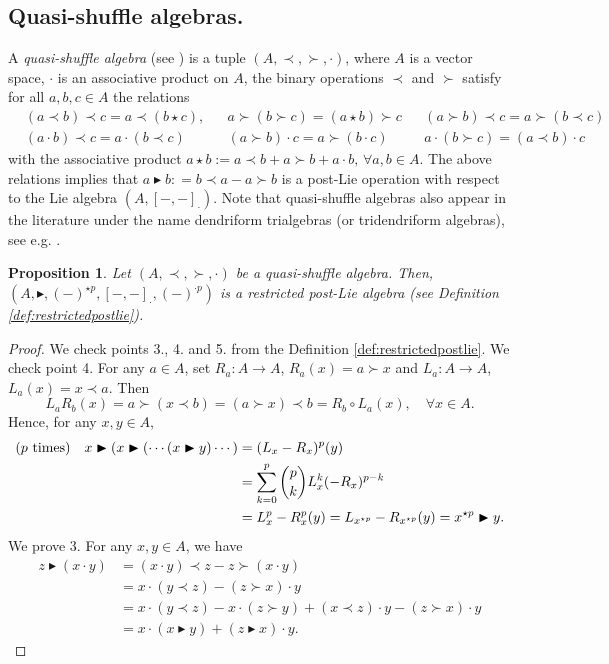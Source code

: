 \documentclass[12pt]{article}
\newcommand{\btr}{\blacktriangleright}
\newtheorem{proposition}[theorem]{Proposition}
\begin{document}
      \subsection{Quasi-shuffle algebras.} A \emph{quasi-shuffle algebra} (see \cite{H}) is a tuple $(A, \prec, \succ, \cdot)$, where $A$ is a vector space, $\cdot$ is an associative product on $A$, the binary operations $\prec$ and $\succ$ satisfy for all $a,b,c\in A$ the relations
      \begin{align}
      &(a \prec b ) \prec c = a \prec (b \star c), &&  a \succ ( b  \succ c ) = (a \star b) \succ c && (a \succ b) \prec c = a \succ (b \prec c) \\
      &(a\cdot b) \prec c = a \cdot (b \prec c)   && (a\succ b) \cdot c = a \succ (b \cdot c) && a\cdot (b \succ c) = (a  \prec b ) \cdot c
      \end{align}
 with the associative product $a\star b := a\prec b+ a\succ b+ a\cdot b,\,\forall a,b\in A$. The above relations implies that $ a \btr b : = b \prec a - a \succ b$ is a post-Lie operation with respect to the Lie algebra $(A, [-,-]_{\cdot})$. Note that quasi-shuffle algebras also appear in the literature under the name dendriform trialgebras (or tridendriform algebras), see e.g. \cite{LR}.

 \begin{proposition} Let $(A, \prec, \succ, \cdot)$ be a quasi-shuffle algebra. Then, 
 $
 (A, \btr, (-)^{\star p},[-,-]_{\cdot}, (-)^{\cdot p})
 $
 is a restricted post-Lie algebra (see Definition \ref{def:restrictedpostlie}).
  \end{proposition}
   \begin{proof} We check points 3., 4. and 5. from the Definition \ref{def:restrictedpostlie}. We check point 4.
   For any $a \in A$, set $R_a\colon A \to A$, $R_a(x) = a \succ x$ and $L_a\colon A \to A$, $L_a(x) = x \prec a$.
   Then 
   $$
   L_a R_b (x) = a\succ (x \prec b) = (a\succ x) \prec b = R_b \circ L_a (x), \quad \forall x \in A.
   $$
   Hence, for any $x,y \in A$,
   \begin{align*}
  (p ~{\rm times}) \quad  x \btr( x \btr( \cdots (x \btr y) \cdots ) & = (L_x - R_x)^{p}(y)  \\
  & = \sum_{k=0}^{p}\binom{p}{k}L_x^k (- R_x)^{p-k}\\  & = L_x^p - R_x^p (y) = L_{x^{\star p}} - R_{x^{\star p}}(y) = x^{\star p} \btr y.
  \end{align*}
We prove 3. For any $x,y\in A$, we have
\begin{align}
z \btr (x\cdot y) &= (x\cdot y) \prec z - z \succ (x\cdot y) \\ &= x \cdot (y \prec z) - (z \succ x) \cdot y \\
&= x \cdot (y \prec z) - x \cdot (z \succ y) + (x \prec z)\cdot y - (z \succ x) \cdot y \\
& = x \cdot (x \btr y) + (z \btr x)\cdot y.
\end{align}
\end{proof}
\end{document}
